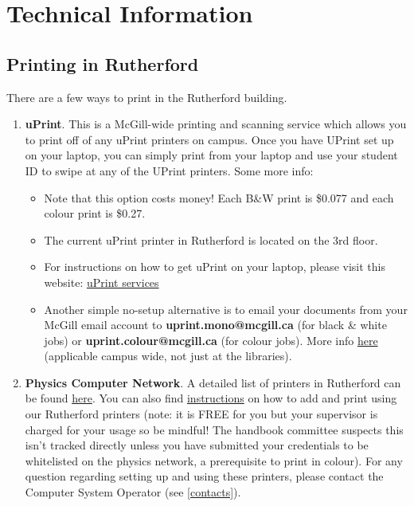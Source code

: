 \section{Technical Information} 
\subsection{Printing in Rutherford}
There are a few ways to print in the Rutherford building.
\begin{enumerate}
  \item \textbf{uPrint}. This is a McGill-wide printing and scanning service which allows you to print off of any uPrint printers on campus. Once you have UPrint set up on your laptop, you can simply print from your laptop and use your student ID to swipe at any of the UPrint printers. Some more info:
  \begin{itemize}
      \item Note that this option costs money! Each B\&W print is \$0.077 and each colour print is \$0.27.
      \item The current uPrint printer in Rutherford is located on the 3rd floor.
      \item For instructions on how to get uPrint on your laptop, please visit this website: \href{https://mcgill.service-now.com/itportal?id=kb_article&sysparm_article=KB0011017}{uPrint services}
      \item Another simple no-setup alternative is to email your documents from your McGill email account to \textbf{uprint.mono@mcgill.ca} (for black \& white jobs) or \textbf{uprint.colour@mcgill.ca} (for colour jobs). More info \href{https://www.mcgill.ca/libraries/using-libraries/scan-print-copy}{here} (applicable campus wide, not just at the libraries).
  \end{itemize}
  \item \textbf{Physics Computer Network}. A detailed list of printers in Rutherford can be found \href{https://www.physics.mcgill.ca/~francois/projects/guidelines.html}{here}. You can also find \href{https://www.physics.mcgill.ca/~francois/projects/guidelines.html#printers}{instructions} on how to add and print using our Rutherford printers (note: it is FREE for you but your supervisor is charged for your usage so be mindful! The handbook committee suspects this isn't tracked directly unless you have submitted your credentials to be whitelisted on the physics network, a prerequisite to print in colour). For any question regarding setting up and using these printers, please contact the Computer System Operator (see \hyperref[contacts]{\textcolor{purble}{\ref*{contacts}}}). 
\end{enumerate} 

